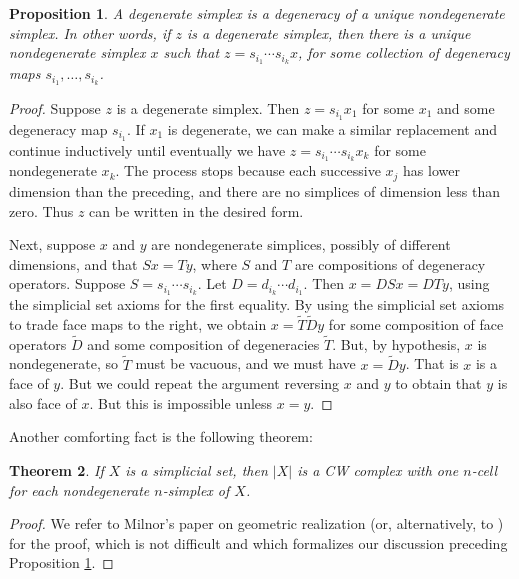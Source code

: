 \documentclass[12pt]{article}
\theoremstyle{plain}
\newtheorem{theorem}{Theorem}[section]
\newtheorem{proposition}[theorem]{Proposition}
\theoremstyle{definition}
\newcommand{\td}[1]{\tilde{#1}}
\begin{document}
\begin{proposition}\label{P: unique deg}
A degenerate simplex is a degeneracy of a unique nondegenerate simplex. In other words, if $z$ is a degenerate simplex, then there is a unique nondegenerate simplex $x$ such that $z=s_{i_1}\cdots s_{i_k}x$, for some collection of degeneracy maps $s_{i_1},\ldots, s_{i_k}$. 
\end{proposition}
\begin{proof}

Suppose  $z$ is a degenerate simplex. Then $z=s_{i_1}x_1$ for some $x_1$ and some degeneracy map $s_{i_1}$. If $x_1$ is degenerate, we can make a similar replacement and  continue inductively until eventually we have  $z=s_{i_1}\cdots s_{i_k}x_k$ for some nondegenerate $x_k$. The process stops because each successive $x_j$ has lower dimension than the preceding, and there are no simplices of dimension less than zero. Thus $z$ can be written in the desired form.

Next, suppose $x$ and $y$ are nondegenerate simplices, possibly of different dimensions, and that $Sx=Ty$, where $S$ and $T$ are compositions of degeneracy operators.  Suppose $S=s_{i_1}\cdots s_{i_k}$. Let $D=d_{i_k}\cdots d_{i_1}$. Then $x=DSx=DTy$, using the simplicial set axioms for the first equality. By using the simplicial set axioms to trade face maps to the right, we obtain $x=\td T\td D y$ for some composition of face operators $\td D$ and some composition of degeneracies $\td T$. But, by hypothesis, $x$ is nondegenerate, so $\td T$ must be vacuous, and we must have $x=\td Dy$. That is $x$ is a face of $y$. But we could repeat the argument reversing $x$ and $y$ to obtain that $y$ is also face of $x$. But this is impossible unless $x=y$.  
\end{proof}



Another comforting fact is the following theorem:

\begin{theorem}\label{T: CW}
If $X$ is a simplicial set, then $|X|$ is a CW complex with one $n$-cell for each nondegenerate $n$-simplex of $X$. 
\end{theorem}
\begin{proof}
 We refer to Milnor's paper on geometric realization \cite{Mi57} (or, alternatively, to \cite[Theorem 14.1]{MAY67}) for the proof, which is not difficult and which formalizes our discussion preceding Proposition \ref{P: unique deg}.
\end{proof}
\end{document}
